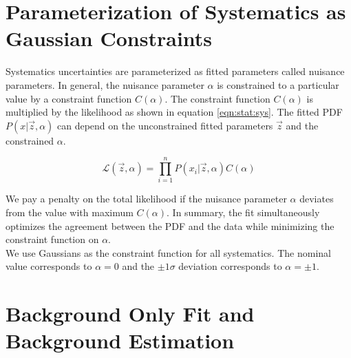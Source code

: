 \section{Parameterization of Systematics as Gaussian Constraints}
\label{sec:stat:sys}

\indent Systematics uncertainties are parameterized as fitted parameters called nuisance parameters.  In general, the nuisance parameter $\alpha$ is constrained to a particular value by a constraint function $C(\alpha)$.   The constraint function $C(\alpha)$ is multiplied by the likelihood as shown in equation \ref{eqn:stat:sys}.  The fitted PDF $P(x|\vec{z},\alpha)$ can depend on the unconstrained fitted parameters $\vec{z}$ and the constrained $\alpha$.  

\begin{equation}
\label{eqn:stat:sys}
{\mathcal{L}}(\vec{z},\alpha) = {\displaystyle\prod_{i=1}^{n}} P(x_i|\vec{z},\alpha) C(\alpha)
\end{equation}


\indent We pay a penalty on the total likelihood if the nuisance parameter $\alpha$ deviates from the value with maximum $C(\alpha)$.  In summary, the fit simultaneously optimizes the agreement between the PDF and the data while minimizing the constraint function on $\alpha$. \\

\indent We use Gaussians as the constraint function for all systematics.  The nominal value corresponds to $\alpha = 0$ and the $\pm1\sigma$ deviation corresponds to $\alpha = \pm1$.  \\


\section{Background Only Fit and Background Estimation}
\label{sec:stat:bkgonly}

